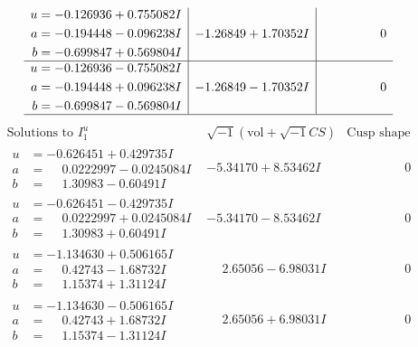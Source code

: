 \documentclass[1p]{elsarticle_modified}
\theoremstyle{definition}
\newcommand{\I}{\sqrt{-1}}
\begin{document}
$$\begin{array}{c|c|c}
\begin{aligned}
u &= -0.126936 + 0.755082 I \\
a &= -0.194448 - 0.096238 I \\
b &= -0.699847 + 0.569804 I\end{aligned}
 & -1.26849 + 1.70352 I & \phantom{-0.000000 } 0 \\ \hline\begin{aligned}
u &= -0.126936 - 0.755082 I \\
a &= -0.194448 + 0.096238 I \\
b &= -0.699847 - 0.569804 I\end{aligned}
 & -1.26849 - 1.70352 I & \phantom{-0.000000 } 0\\
 \hline 
 \end{array}$$\newpage$$\begin{array}{c|c|c}  
\text{Solutions to }I^u_{1}& \I (\text{vol} + \sqrt{-1}CS) & \text{Cusp shape}\\
 \hline 
\begin{aligned}
u &= -0.626451 + 0.429735 I \\
a &= \phantom{-}0.0222997 - 0.0245084 I \\
b &= \phantom{-}1.30983 - 0.60491 I\end{aligned}
 & -5.34170 + 8.53462 I & \phantom{-0.000000 } 0 \\ \hline\begin{aligned}
u &= -0.626451 - 0.429735 I \\
a &= \phantom{-}0.0222997 + 0.0245084 I \\
b &= \phantom{-}1.30983 + 0.60491 I\end{aligned}
 & -5.34170 - 8.53462 I & \phantom{-0.000000 } 0 \\ \hline\begin{aligned}
u &= -1.134630 + 0.506165 I \\
a &= \phantom{-}0.42743 - 1.68732 I \\
b &= \phantom{-}1.15374 + 1.31124 I\end{aligned}
 & \phantom{-}2.65056 - 6.98031 I & \phantom{-0.000000 } 0 \\ \hline\begin{aligned}
u &= -1.134630 - 0.506165 I \\
a &= \phantom{-}0.42743 + 1.68732 I \\
b &= \phantom{-}1.15374 - 1.31124 I\end{aligned}
 & \phantom{-}2.65056 + 6.98031 I & \phantom{-0.000000 } 0 \\ \hline\begin{aligned}

\end{aligned}
\end{array}$$
\end{document}
